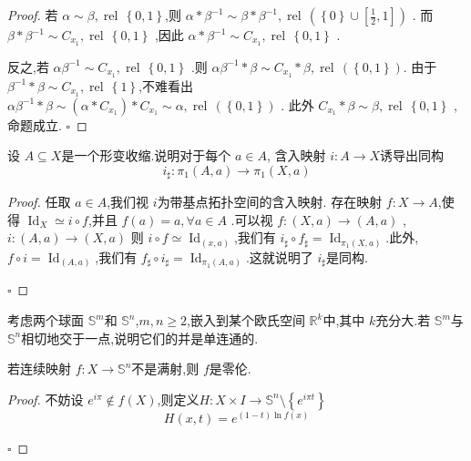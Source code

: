 \documentclass[../../几何与拓扑.tex]{subfiles}
\begin{document}
\begin{problemset}
\begin{proof}
        若 \(  \alpha \sim \beta ,\operatorname{rel}\,\left\{ 0,1 \right\}  \),则 \(  \alpha *\beta ^{-1} \sim \beta *\beta ^{-1} ,\operatorname{rel}\,(\left\{ 0 \right\}\cup [\frac{1}{2},1])  \)  .
        而 \(  \beta *\beta ^{-1} \sim C_{x_1},\operatorname{rel}\,\left\{ 0,1 \right\}  \) ,因此 \(  \alpha *\beta ^{-1} \sim C_{x_1},\operatorname{rel}\,\left\{ 0,1 \right\}  \) .


        反之,若 \(  \alpha \beta ^{-1} \sim C_{x_1},\operatorname{rel}\,\left\{ 0,1 \right\}  \) .则 \(  \alpha \beta ^{-1} * \beta \sim C_{x_1}*\beta ,\operatorname{rel}\,\left( \left\{ 0,1 \right\} \right)   \).
        由于 \(  \beta ^{-1} *\beta \sim C_{x_1},\operatorname{rel}\,\left\{ 1 \right\}  \),不难看出  \(  \alpha \beta ^{-1} *\beta \sim   \left( \alpha *C_{x_1} \right)*C_{x_1} \sim \alpha ,\operatorname{rel}\,\left( \left\{ 0 , 1\right\} \right)    \)  .
        此外 \(  C_{x_1}* \beta \sim \beta ,\operatorname{rel}\,\left\{ 0,1 \right\}  \) ,命题成立.
        \hfill $\square$
     \end{proof}
     
     \item 设 \(  A\subseteq X  \)是一个形变收缩.说明对于每个 \(  a \in A  \), 含入映射 \(  i: A \to X  \)诱导出同构 \[
     i_{\sharp }: \pi _1 \left( A,a \right)\to \pi _1 \left( X,a \right)  
     \]  
     \begin{proof}
        任取 \(  a \in A  \),我们视 \(  i  \)为带基点拓扑空间的含入映射.
        存在映射 \(  f: X \to A  \),使得  \(  \operatorname{Id}_{X}\simeq i\circ f  \),并且  \(  f\left( a \right)= a,\forall  a \in A  \)  .可以视 \(  f: \left( X,a \right)\to \left( A,a \right)    \) , \(  i: \left( A,a \right)\to \left( X,a \right)    \) 
        则 \(  i\circ f \simeq \operatorname{Id}_{\left( x,a \right) }  \),我们有 \(  i_{\sharp }\circ f_{\sharp } =  \operatorname{Id}_{\pi _1 \left( X,a \right) }  \).此外, \(  f\circ i =  \operatorname{Id}_{\left( A,a \right) }  \),我们有 \(  f_{\sharp }\circ i_{\sharp } =  \operatorname{Id}_{\pi _1 \left( A,a \right) }  \).这就说明了     \(  i _{\sharp }  \)是同构. 
     
        \hfill $\square$
     \end{proof}
     \item 考虑两个球面 \(  \mathbb{S}^{m}  \)和 \(  \mathbb{S}^{n}  \),\(  m,n\ge 2  \),嵌入到某个欧氏空间 \(  \mathbb{R} ^{k}  \)中,其中 \(  k  \)充分大.若 \(  \mathbb{S}^{m}  \)与 \(  \mathbb{S}^{n}  \)相切地交于一点,说明它们的并是单连通的.     
     \item 若连续映射 \(  f: X \to \mathbb{S}^{n}  \)不是满射,则 \(  f  \)是零伦.
     \begin{proof}
     
        不妨设 \(  e^{i \pi } \not\in f\left( X\right)   \),则定义\(  H: X\times I \to \mathbb{S}^{n} \setminus \left\{ e^{i\pi t} \right\} \)  \[
        H\left( x,t \right) =  e^{\left( 1-t \right)\ln f\left( x \right)  }
        \] 
     
        \hfill $\square$
     \end{proof}  
\end{problemset}
\end{document}
